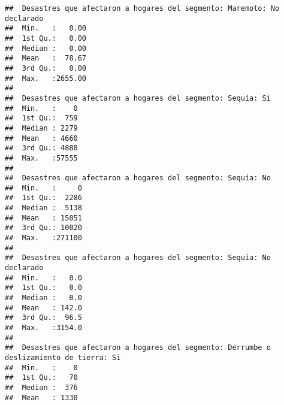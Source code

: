 \documentclass[11pt,]{article}
\begin{document}
\begin{verbatim}
##  Desastres que afectaron a hogares del segmento: Maremoto: No declarado
##  Min.   :   0.00                                                       
##  1st Qu.:   0.00                                                       
##  Median :   0.00                                                       
##  Mean   :  78.67                                                       
##  3rd Qu.:   0.00                                                       
##  Max.   :2655.00                                                       
##                                                                        
##  Desastres que afectaron a hogares del segmento: Sequía: Si
##  Min.   :    0                                             
##  1st Qu.:  759                                             
##  Median : 2279                                             
##  Mean   : 4660                                             
##  3rd Qu.: 4888                                             
##  Max.   :57555                                             
##                                                            
##  Desastres que afectaron a hogares del segmento: Sequía: No
##  Min.   :     0                                            
##  1st Qu.:  2286                                            
##  Median :  5138                                            
##  Mean   : 15051                                            
##  3rd Qu.: 10020                                            
##  Max.   :271100                                            
##                                                            
##  Desastres que afectaron a hogares del segmento: Sequía: No declarado
##  Min.   :   0.0                                                      
##  1st Qu.:   0.0                                                      
##  Median :   0.0                                                      
##  Mean   : 142.0                                                      
##  3rd Qu.:  96.5                                                      
##  Max.   :3154.0                                                      
##                                                                      
##  Desastres que afectaron a hogares del segmento: Derrumbe o deslizamiento de tierra: Si
##  Min.   :    0                                                                         
##  1st Qu.:   70                                                                         
##  Median :  376                                                                         
##  Mean   : 1330                                                                         

\end{verbatim}
\end{document}
